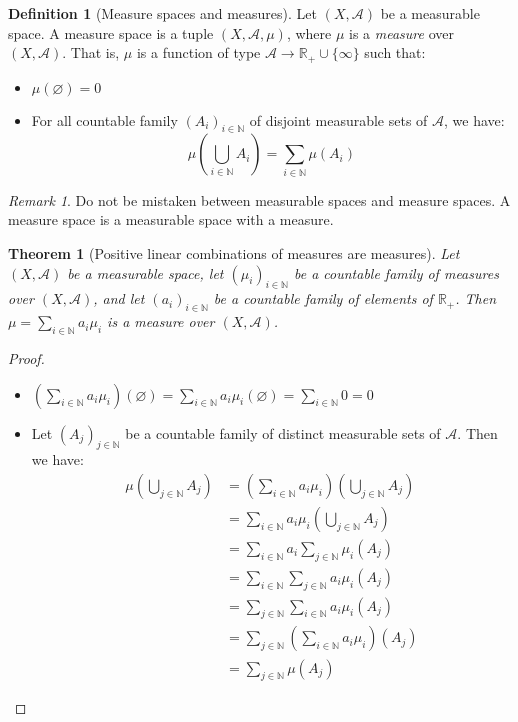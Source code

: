 \documentclass{article}
\newtheorem{theorem}{Theorem}[section]
\theoremstyle{definition}
\newtheorem{definition}{Definition}[section]
\theoremstyle{remark}
\newtheorem*{remark}{Remark}
\theoremstyle{example}
\begin{document}
\begin{definition}[Measure spaces and measures]
    Let $(X, \mathcal{A})$ be a measurable space. A measure space is a tuple $(X, \mathcal{A}, \mu)$, where $\mu$ is a \textit{measure} over $(X, \mathcal{A})$. That is, $\mu$ is a function of type $\mathcal{A} \rightarrow \mathbb{R}_+ \cup \{\infty\}$ such that:
    \begin{itemize}
        \item $\mu(\varnothing) = 0$
        \item For all countable family $(A_i)_{i \in \mathbb{N}}$ of disjoint measurable sets of $\mathcal{A}$, we have:
            $$\mu(\bigcup_{i \in \mathbb{N}} A_i) = \sum_{i \in \mathbb{N}} \mu(A_i)$$
    \end{itemize}
\end{definition}

\begin{remark}
    Do not be mistaken between measurable spaces and measure spaces. A measure space is a measurable space with a measure.
\end{remark}

\begin{theorem}[Positive linear combinations of measures are measures]
    Let $(X, \mathcal{A})$ be a measurable space, let $(\mu_i)_{i \in \mathbb{N}}$ be a countable family of measures over $(X, \mathcal{A})$, and let $(a_i)_{i \in \mathbb{N}}$ be a countable family of elements of $\mathbb{R}_+$. Then $\mu = \sum_{i \in \mathbb{N}} a_i \mu_i$ is a measure over $(X, \mathcal{A})$.
\end{theorem}

\begin{proof}~
    \begin{itemize}
        \item $\left(\sum_{i \in \mathbb{N}} a_i \mu_i\right)(\varnothing) = \sum_{i \in \mathbb{N}} a_i \mu_i(\varnothing) = \sum_{i \in \mathbb{N}} 0 = 0$
        \item Let $(A_j)_{j \in \mathbb{N}}$ be a countable family of distinct measurable sets of $\mathcal{A}$. Then we have:
        \begin{align*}
            \mu(\bigcup_{j \in \mathbb{N}} A_j) &= \left(\sum_{i \in \mathbb{N}} a_i \mu_i\right)(\bigcup_{j \in \mathbb{N}} A_j)\\
            &= \sum_{i \in \mathbb{N}} a_i \mu_i(\bigcup_{j \in \mathbb{N}} A_j)\\
            &= \sum_{i \in \mathbb{N}} a_i \sum_{j \in \mathbb{N}} \mu_i(A_j)\\
            &= \sum_{i \in \mathbb{N}} \sum_{j \in \mathbb{N}} a_i \mu_i(A_j)\\
            &= \sum_{j \in \mathbb{N}} \sum_{i \in \mathbb{N}} a_i \mu_i(A_j)\\
            &= \sum_{j \in \mathbb{N}} \left(\sum_{i \in \mathbb{N}} a_i \mu_i\right)(A_j)\\
            &= \sum_{j \in \mathbb{N}} \mu(A_j)
        \end{align*}
    \end{itemize}
\end{proof}
\end{document}
